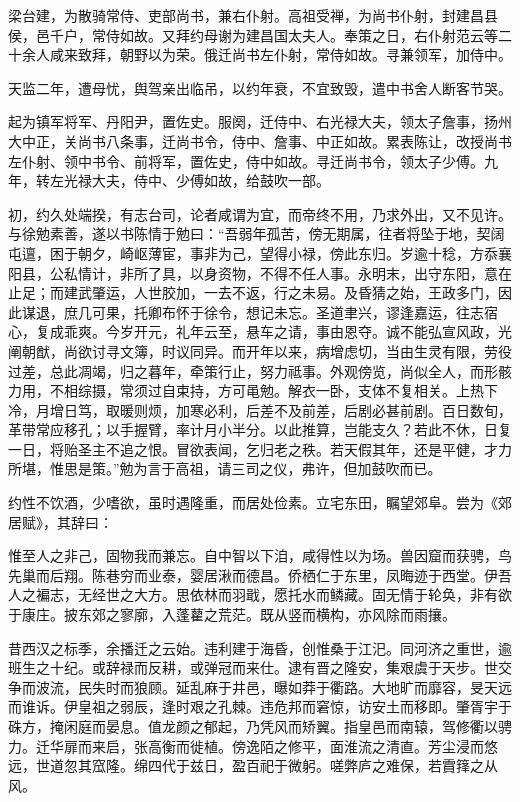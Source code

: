 \documentclass[12pt,UTF8]{ctexbook}
\begin{document}
梁台建，为散骑常侍、吏部尚书，兼右仆射。高祖受禅，为尚书仆射，封建昌县侯，邑千户，常侍如故。又拜约母谢为建昌国太夫人。奉策之日，右仆射范云等二十余人咸来致拜，朝野以为荣。俄迁尚书左仆射，常侍如故。寻兼领军，加侍中。

天监二年，遭母忧，舆驾亲出临吊，以约年衰，不宜致毁，遣中书舍人断客节哭。

起为镇军将军、丹阳尹，置佐史。服阕，迁侍中、右光禄大夫，领太子詹事，扬州大中正，关尚书八条事，迁尚书令，侍中、詹事、中正如故。累表陈让，改授尚书左仆射、领中书令、前将军，置佐史，侍中如故。寻迁尚书令，领太子少傅。九年，转左光禄大夫，侍中、少傅如故，给鼓吹一部。

初，约久处端揆，有志台司，论者咸谓为宜，而帝终不用，乃求外出，又不见许。与徐勉素善，遂以书陈情于勉曰：“吾弱年孤苦，傍无期属，往者将坠于地，契阔屯邅，困于朝夕，崎岖薄宦，事非为己，望得小禄，傍此东归。岁逾十稔，方忝襄阳县，公私情计，非所了具，以身资物，不得不任人事。永明末，出守东阳，意在止足；而建武肇运，人世胶加，一去不返，行之未易。及昏猜之始，王政多门，因此谋退，庶几可果，托卿布怀于徐令，想记未忘。圣道聿兴，谬逢嘉运，往志宿心，复成乖爽。今岁开元，礼年云至，悬车之请，事由恩夺。诚不能弘宣风政，光阐朝猷，尚欲讨寻文簿，时议同异。而开年以来，病增虑切，当由生灵有限，劳役过差，总此凋竭，归之暮年，牵策行止，努力祗事。外观傍览，尚似全人，而形骸力用，不相综摄，常须过自束持，方可黾勉。解衣一卧，支体不复相关。上热下冷，月增日笃，取暖则烦，加寒必利，后差不及前差，后剧必甚前剧。百日数旬，革带常应移孔；以手握臂，率计月小半分。以此推算，岂能支久？若此不休，日复一日，将贻圣主不追之恨。冒欲表闻，乞归老之秩。若天假其年，还是平健，才力所堪，惟思是策。”勉为言于高祖，请三司之仪，弗许，但加鼓吹而已。

约性不饮酒，少嗜欲，虽时遇隆重，而居处俭素。立宅东田，瞩望郊阜。尝为《郊居赋》，其辞曰：

惟至人之非己，固物我而兼忘。自中智以下洎，咸得性以为场。兽因窟而获骋，鸟先巢而后翔。陈巷穷而业泰，婴居湫而德昌。侨栖仁于东里，凤晦迹于西堂。伊吾人之褊志，无经世之大方。思依林而羽戢，愿托水而鳞藏。固无情于轮奂，非有欲于康庄。披东郊之寥廓，入蓬藋之荒茫。既从竖而横构，亦风除而雨攘。

昔西汉之标季，余播迁之云始。违利建于海昏，创惟桑于江汜。同河济之重世，逾班生之十纪。或辞禄而反耕，或弹冠而来仕。逮有晋之隆安，集艰虞于天步。世交争而波流，民失时而狼顾。延乱麻于井邑，曝如莽于衢路。大地旷而靡容，旻天远而谁诉。伊皇祖之弱辰，逢时艰之孔棘。违危邦而窘惊，访安土而移即。肇胥宇于硃方，掩闲庭而晏息。值龙颜之郁起，乃凭风而矫翼。指皇邑而南辕，驾修衢以骋力。迁华扉而来启，张高衡而徙植。傍逸陌之修平，面淮流之清直。芳尘浸而悠远，世道忽其窊隆。绵四代于兹日，盈百祀于微躬。嗟弊庐之难保，若霣箨之从风。
\end{document}
